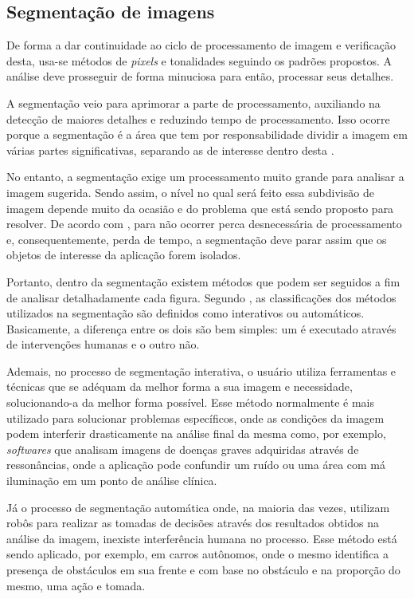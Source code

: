 \subsection{\textbf{Segmentação de imagens}}

De forma a dar continuidade ao ciclo de processamento de imagem e verificação desta, usa-se métodos de \textit{pixels} e tonalidades seguindo os padrões propostos. A análise deve prosseguir de forma minuciosa para então, processar seus detalhes.

A segmentação veio para aprimorar a parte de processamento, auxiliando na detecção de maiores detalhes e reduzindo tempo de processamento. Isso ocorre porque a segmentação é a área que tem por responsabilidade dividir a imagem em várias partes significativas, separando as de interesse dentro desta \cite{FILHO1999}.

No entanto, a segmentação exige um processamento muito grande para analisar a imagem sugerida. Sendo assim, o nível no qual será feito essa subdivisão de imagem depende muito da ocasião e do problema que está sendo proposto para resolver. De acordo com , para não ocorrer perca desnecessária de processamento e, consequentemente, perda de tempo, a segmentação deve parar assim que os objetos de interesse da aplicação forem isolados.

Portanto, dentro da segmentação existem métodos que podem ser seguidos a fim de analisar detalhadamente cada figura. Segundo , as classificações dos métodos utilizados na segmentação são definidos como interativos ou automáticos. Basicamente, a diferença entre os dois são bem simples: um é executado através de intervenções humanas e o outro não.

Ademais, no processo de segmentação interativa, o usuário utiliza ferramentas e técnicas que se adéquam da melhor forma a sua imagem e necessidade, solucionando-a da melhor forma possível. Esse método normalmente é mais utilizado para solucionar problemas específicos, onde as condições da imagem podem interferir drasticamente na análise final da mesma como, por exemplo, \textit{softwares} que analisam imagens de doenças graves adquiridas através de ressonâncias, onde a aplicação pode confundir um ruído ou uma área com má iluminação em um ponto de análise clínica.

Já o processo de segmentação automática onde, na maioria das vezes, utilizam robôs para realizar as tomadas de decisões através dos resultados obtidos na análise da imagem, inexiste interferência humana no processo. Esse método está sendo aplicado, por exemplo, em carros autônomos, onde o mesmo identifica a presença de obstáculos em sua frente e com base no obstáculo e na proporção do mesmo, uma ação e tomada.

